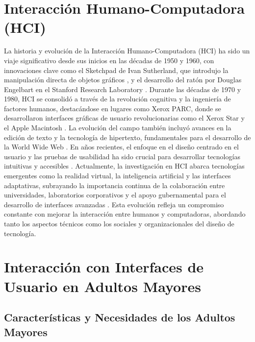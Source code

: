 \section{Interacción Humano-Computadora (HCI)}

La historia y evolución de la Interacción Humano-Computadora (HCI) ha sido un viaje significativo desde sus inicios en las décadas de 1950 y 1960, con innovaciones clave como el Sketchpad de Ivan Sutherland, que introdujo la manipulación directa de objetos gráficos \cite{myers_brief_1998}, y el desarrollo del ratón por Douglas Engelbart en el Stanford Research Laboratory \cite{myers_brief_1998}. Durante las décadas de 1970 y 1980, HCI se consolidó a través de la revolución cognitiva y la ingeniería de factores humanos, destacándose en lugares como Xerox PARC, donde se desarrollaron interfaces gráficas de usuario revolucionarias como el Xerox Star y el Apple Macintosh \cite{grudin_moving_2012,myers_brief_1998}. La evolución del campo también incluyó avances en la edición de texto y la tecnología de hipertexto, fundamentales para el desarrollo de la World Wide Web \cite{myers_brief_1998}. En años recientes, el enfoque en el diseño centrado en el usuario y las pruebas de usabilidad ha sido crucial para desarrollar tecnologías intuitivas y accesibles \cite{jain_human-computer_2023}. Actualmente, la investigación en HCI abarca tecnologías emergentes como la realidad virtual, la inteligencia artificial y las interfaces adaptativas, subrayando la importancia continua de la colaboración entre universidades, laboratorios corporativos y el apoyo gubernamental para el desarrollo de interfaces avanzadas \cite{harrison_three_2007,myers_brief_1998}. Esta evolución refleja un compromiso constante con mejorar la interacción entre humanos y computadoras, abordando tanto los aspectos técnicos como los sociales y organizacionales del diseño de tecnología.


\section{Interacción con Interfaces de Usuario en Adultos Mayores}
\subsection{Características y Necesidades de los Adultos Mayores}

